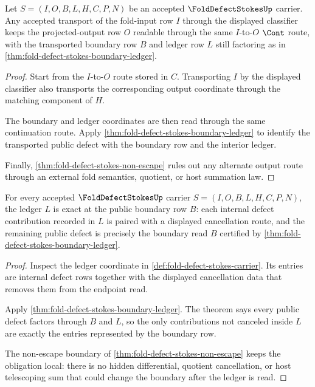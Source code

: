\begin{theorem}
\label{thm:fold-defect-stokes-projection-stability}
Let $S=(I,O,B,L,H,C,P,N)$ be an accepted $\FoldDefectStokesUp$ carrier. Any accepted transport of the fold-input row $I$ through the displayed classifier keeps the projected-output row $O$ readable through the same $I$-to-$O$ $\Cont$ route, with the transported boundary row $B$ and ledger row $L$ still factoring as in \autoref{thm:fold-defect-stokes-boundary-ledger}.
\end{theorem}
\begin{proof}
Start from the $I$-to-$O$ route stored in $C$. Transporting $I$ by the displayed classifier also transports the corresponding output coordinate through the matching component of $H$.

The boundary and ledger coordinates are then read through the same continuation route. Apply \autoref{thm:fold-defect-stokes-boundary-ledger} to identify the transported public defect with the boundary row and the interior ledger.

Finally, \autoref{thm:fold-defect-stokes-non-escape} rules out any alternate output route through an external fold semantics, quotient, or host summation law.
\end{proof}

\begin{theorem}
\label{thm:fold-defect-stokes-exactness-obligation}
For every accepted $\FoldDefectStokesUp$ carrier $S=(I,O,B,L,H,C,P,N)$, the ledger $L$ is exact at the public boundary row $B$: each internal defect contribution recorded in $L$ is paired with a displayed cancellation route, and the remaining public defect is precisely the boundary read $B$ certified by \autoref{thm:fold-defect-stokes-boundary-ledger}.
\end{theorem}
\begin{proof}
Inspect the ledger coordinate in \autoref{def:fold-defect-stokes-carrier}. Its entries are internal defect rows together with the displayed cancellation data that removes them from the endpoint read.

Apply \autoref{thm:fold-defect-stokes-boundary-ledger}. The theorem says every public defect factors through $B$ and $L$, so the only contributions not canceled inside $L$ are exactly the entries represented by the boundary row.

The non-escape boundary of \autoref{thm:fold-defect-stokes-non-escape} keeps the obligation local: there is no hidden differential, quotient cancellation, or host telescoping sum that could change the boundary after the ledger is read.
\end{proof}

